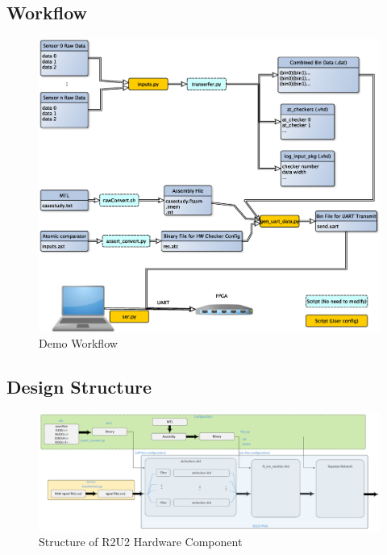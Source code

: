 \documentclass{article}
\theoremstyle{definition}
\begin{document}
\subsection{Workflow}
\begin{figure}[h]
\caption{Demo Workflow}
\label{workflow}
\includegraphics[width=15cm]{./fig/r2u2_process.eps}
\centering
\end{figure}

\clearpage

\subsection{Design Structure}
\begin{figure}[h]
\caption{Structure of R2U2 Hardware Component}
\label{workflow}
\includegraphics[width=16cm]{./fig/project_structure.png}
\centering
\end{figure}

\clearpage
\end{document}
